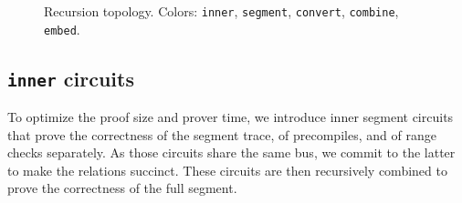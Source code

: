 \begin{figure}
	\caption{\label{fig:topo} Recursion topology. Colors: \colorbox{yellow!10}{\texttt{inner}}, \colorbox{green!12}{\texttt{segment}}, \colorbox{orange!15}{\texttt{convert}}, \colorbox{blue!12}{\texttt{combine}}, \colorbox{purple!15}{\texttt{embed}}.}
\end{figure}

\subsection{\texttt{inner} circuits}

To optimize the proof size and prover time,
we introduce inner segment circuits that prove
the correctness of the segment trace, of precompiles,
and of range checks separately. As those
circuits share the same bus, we commit to the latter
to make the relations succinct.
These circuits are then recursively
combined  to prove the correctness of the full segment.

